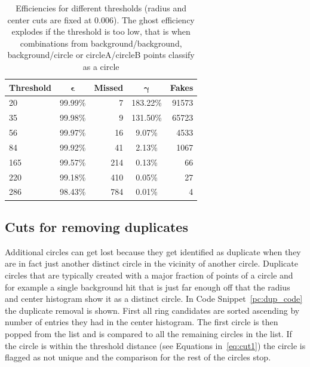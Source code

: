 \documentclass[11pt,twoside]{scrreprt}
\begin{document}
\begin{table}[tb]
  \caption[Efficiencies for different thresholds]{Efficiencies for different thresholds (radius and center cuts are fixed at $0.006$). The ghost efficiency explodes if the threshold is too low, that is when combinations
  from background/background, background/circle or circleA/circleB points classify as a circle}
  \label{tab:threshold_cuts}
  \centering

  \begin{tabular}{lcrcr}
  \toprule
  \textbf{Threshold} & $\boldsymbol{\epsilon}$ & \textbf{Missed} & $\boldsymbol{\gamma}$ & \textbf{Fakes} \\
  \midrule
  20  & 99.99\% & 7 & 183.22\% & 91573 \\
  35  & 99.98\% & 9 & 131.50\% & 65723 \\
  56  & 99.97\% & 16 & 9.07\% & 4533 \\
  84  & 99.92\% & 41 & 2.13\% & 1067 \\
  165 & 99.57\% & 214 & 0.13\% & 66 \\
  220 & 99.18\% & 410 & 0.05\% & 27 \\
  286 & 98.43\% & 784 & 0.01\% & 4 \\
  \bottomrule
  \end{tabular}
\end{table}


\subsection{Cuts for removing duplicates} %
\label{sub:different_cuts_for_circle_selection}

Additional circles can get lost because they get identified as duplicate when they are in fact just another distinct circle in 
the vicinity of another circle. Duplicate circles that are typically created with a major fraction of points of a circle and for 
example a single background hit that is just far enough off that the radius and center histogram show it as a distinct circle. 
In Code Snippet~\ref{pc:dup_code} the duplicate removal is shown. First all ring candidates are sorted ascending by number of 
entries they had in the center histogram. The first circle is then popped from the list and is compared to all the remaining circles 
in the list. If the circle is within the threshold distance (see Equations in~\ref{eq:cut1}) the circle is flagged as not unique and 
the comparison for the rest of the circles stop. 
\end{document}
